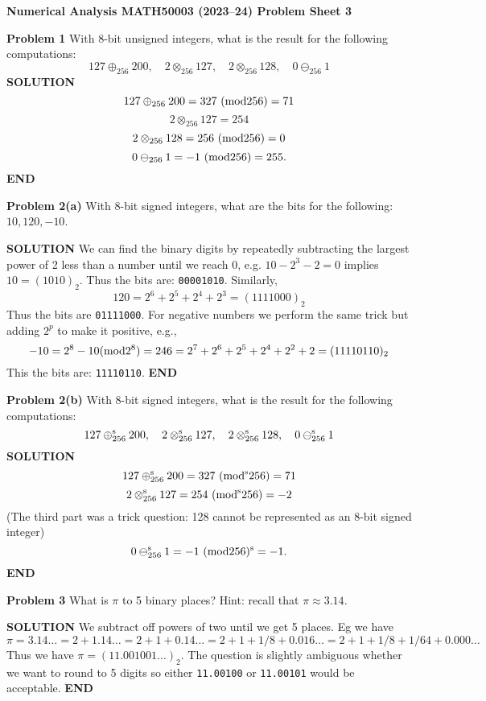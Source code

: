 \documentclass[12pt,a4paper]{article}
\def\endash{–}
\begin{document}
\textbf{Numerical Analysis MATH50003 (2023\ensuremath{\endash}24) Problem Sheet 3}

\textbf{Problem 1} With 8-bit unsigned integers, what is the result for the following computations:
\[
127 \ensuremath{\oplus}_{256} 200,\quad 2 \ensuremath{\otimes}_{256} 127,\quad 2 \ensuremath{\otimes}_{256} 128, \quad 0 \ensuremath{\ominus}_{256} 1
\]
\textbf{SOLUTION}
\[
127 \ensuremath{\oplus}_{256} 200 = 327\ ({\rm mod} 256) = 71
\]
\[
2 \ensuremath{\otimes}_{256} 127 = 254
\]
\[
2 \ensuremath{\otimes}_{256} 128 = 256 \ ({\rm mod} 256) = 0
\]
\[
0 \ensuremath{\ominus}_{256} 1 = -1  \ ({\rm mod} 256) = 255.
\]
\textbf{END}

\textbf{Problem 2(a)} With 8-bit signed integers, what are the bits for the following: $10, 120, -10$.

\textbf{SOLUTION} We can find the binary digits by repeatedly subtracting the largest power of 2 less than a number until we reach 0, e.g. $10 - 2^3 - 2 = 0$ implies $10 = (1010)_2$. Thus the bits are: \texttt{00001010}. Similarly,
\[
120 = 2^6 + 2^5 + 2^4 + 2^3 = (1111000)_2
\]
Thus the bits are \texttt{01111000}. For negative numbers we perform the same trick but adding $2^p$ to make it positive, e.g.,
\[
-10 = 2^8 - 10 ({\rm mod 2^8}) = 246 = 2^7 + 2^6 + 2^5 + 2^4 + 2^2 + 2 = (11110110)_2
\]
This the bits are: \texttt{11110110}. \textbf{END}

\textbf{Problem 2(b)} With 8-bit signed integers, what is the result for the following computations:
\[
127 \ensuremath{\oplus}_{256}^{\rm s} 200,\quad 2 \ensuremath{\otimes}_{256}^{\rm s} 127, \quad 2 \ensuremath{\otimes}_{256}^{\rm s} 128, \quad 0 \ensuremath{\ominus}_{256}^{\rm s} 1
\]
\textbf{SOLUTION}
\[
127 \ensuremath{\oplus}_{256}^{\rm s} 200 = 327\ ({\rm mod}^{\rm s} 256) = 71
\]
\[
2 \ensuremath{\otimes}_{256}^{\rm s} 127 = 254\ ({\rm mod}^{\rm s} 256) = -2
\]
(The third part was a trick question: 128 cannot be represented as an 8-bit signed integer)
\[
0 \ensuremath{\ominus}_{256}^{\rm s} 1 = -1  \ ({\rm mod} 256)^{\rm s} = -1.
\]
\textbf{END}

\textbf{Problem 3} What is $\ensuremath{\pi}$ to 5 binary places? Hint: recall that $\ensuremath{\pi} \ensuremath{\approx} 3.14$.

\textbf{SOLUTION} We subtract off powers of two until we get 5 places. Eg we have
\[
\ensuremath{\pi} = 3.14\ensuremath{\ldots} = 2 + 1.14\ensuremath{\ldots} = 2 + 1 + 0.14\ensuremath{\ldots} = 2 + 1 + 1/8 + 0.016\ensuremath{\ldots} = 2 + 1 + 1/8  + 1/64  + 0.000\ensuremath{\ldots}
\]
Thus we have $\ensuremath{\pi} = (11.001001\ensuremath{\ldots})_2$. The question is slightly ambiguous whether we want to round to 5 digits so either \texttt{11.00100} or \texttt{11.00101} would be acceptable. \textbf{END}
\end{document}
